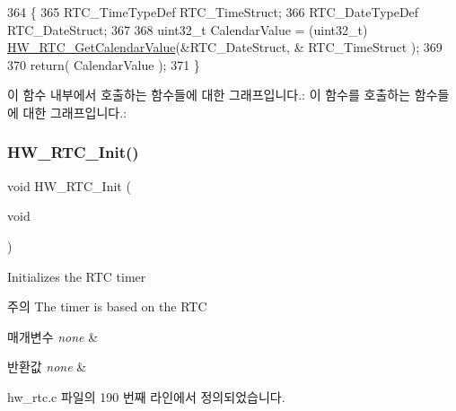 \begin{DoxyCode}
364 \{
365   RTC\_TimeTypeDef RTC\_TimeStruct;
366   RTC\_DateTypeDef RTC\_DateStruct;
367   
368   uint32\_t CalendarValue = (uint32\_t) \mbox{\hyperlink{group___lory_s_d_k___r_t_c___functions_gaf81b8dc866a5c7b125355b55e3953387}{HW\_RTC\_GetCalendarValue}}(&RTC\_DateStruct, &
      RTC\_TimeStruct );
369 
370   \textcolor{keywordflow}{return}( CalendarValue );
371 \}
\end{DoxyCode}
이 함수 내부에서 호출하는 함수들에 대한 그래프입니다.\+:
이 함수를 호출하는 함수들에 대한 그래프입니다.\+:
\mbox{\label{group___lory_s_d_k___r_t_c___functions_ga3021a4a33084812668411847ec35d71d}} 
\subsubsection{\texorpdfstring{H\+W\+\_\+\+R\+T\+C\+\_\+\+Init()}{HW\_RTC\_Init()}}
{\footnotesize\ttfamily void H\+W\+\_\+\+R\+T\+C\+\_\+\+Init (\begin{DoxyParamCaption}\item[{void}]{ }\end{DoxyParamCaption})}



Initializes the R\+TC timer 

\begin{DoxyNote}{주의}
The timer is based on the R\+TC 
\end{DoxyNote}

\begin{DoxyParams}{매개변수}
{\em none} & \\
\hline
\end{DoxyParams}

\begin{DoxyRetVals}{반환값}
{\em none} & \\
\hline
\end{DoxyRetVals}


hw\+\_\+rtc.\+c 파일의 190 번째 라인에서 정의되었습니다.



